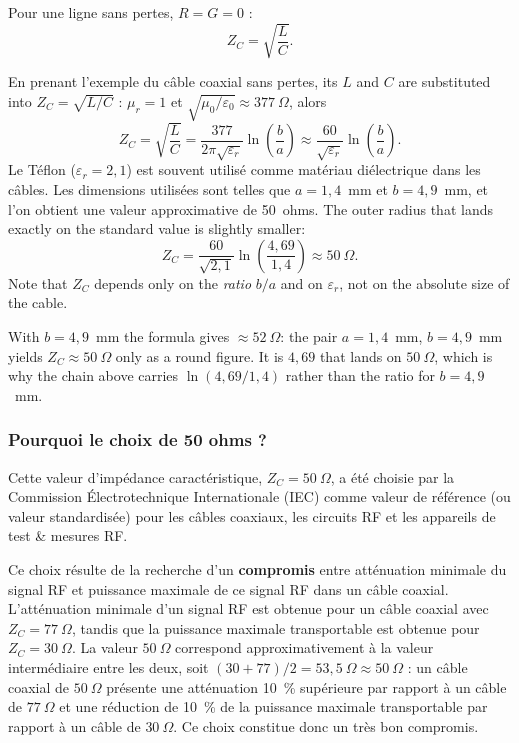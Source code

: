 \begin{corollary}
  Pour une ligne sans pertes, $R = G = 0$ :
  \[
    Z_C = \sqrt{\frac{L}{C}} .
  \]
\end{corollary}

\begin{example}
  En prenant l'exemple du câble coaxial sans pertes, its $L$ and $C$ are
  substituted into $Z_C = \sqrt{L/C}$ : $\mu_r = 1$ et
  $\sqrt{\mu_0/\varepsilon_0} \approx 377\ \Omega$, alors
  \[
    Z_C = \sqrt{\frac{L}{C}}
        = \frac{377}{2\pi\sqrt{\varepsilon_r}}\ln\!\left(\frac{b}{a}\right)
        \approx \frac{60}{\sqrt{\varepsilon_r}}\ln\!\left(\frac{b}{a}\right).
  \]
  Le Téflon ($\varepsilon_r = 2{,}1$) est souvent utilisé comme matériau
  diélectrique dans les câbles. Les dimensions utilisées sont telles que
  $a = 1{,}4$~mm et $b = 4{,}9$~mm, et l'on obtient une valeur approximative de
  50~ohms. The outer radius that lands exactly on the standard value is
  slightly smaller:
  \[
    Z_C = \frac{60}{\sqrt{2{,}1}}\ln\!\left(\frac{4{,}69}{1{,}4}\right)
        \approx 50\ \Omega .
  \]
  Note that $Z_C$ depends only on the \emph{ratio} $b/a$ and on
  $\varepsilon_r$, not on the absolute size of the cable.
\end{example}

\begin{remark}
  With $b = 4{,}9$~mm the formula gives $\approx 52\ \Omega$: the pair
  $a = 1{,}4$~mm, $b = 4{,}9$~mm yields $Z_C \approx 50\ \Omega$ only as a
  round figure. It is $4{,}69$ that lands on $50\ \Omega$, which is why the
  chain above carries $\ln(4{,}69/1{,}4)$ rather than the ratio for
  $b = 4{,}9$~mm.
\end{remark}

\subsubsection{Pourquoi le choix de 50 ohms ?}
Cette valeur d'impédance caractéristique, $Z_C = 50\ \Omega$, a été choisie par
la Commission Électrotechnique Internationale (IEC) comme valeur de référence
(ou valeur standardisée) pour les câbles coaxiaux, les circuits RF et les
appareils de test \& mesures RF.

Ce choix résulte de la recherche d'un \textbf{compromis} entre atténuation
minimale du signal RF et puissance maximale de ce signal RF dans un câble
coaxial. L'atténuation minimale d'un signal RF est obtenue pour un câble
coaxial avec $Z_C = 77\ \Omega$, tandis que la puissance maximale transportable
est obtenue pour $Z_C = 30\ \Omega$. La valeur $50\ \Omega$ correspond
approximativement à la valeur intermédiaire entre les deux, soit
$(30+77)/2 = 53{,}5\ \Omega \approx 50\ \Omega$ : un câble coaxial de
$50\ \Omega$ présente une atténuation 10~\% supérieure par rapport à un câble
de $77\ \Omega$ et une réduction de 10~\% de la puissance maximale
transportable par rapport à un câble de $30\ \Omega$. Ce choix constitue donc
un très bon compromis.

